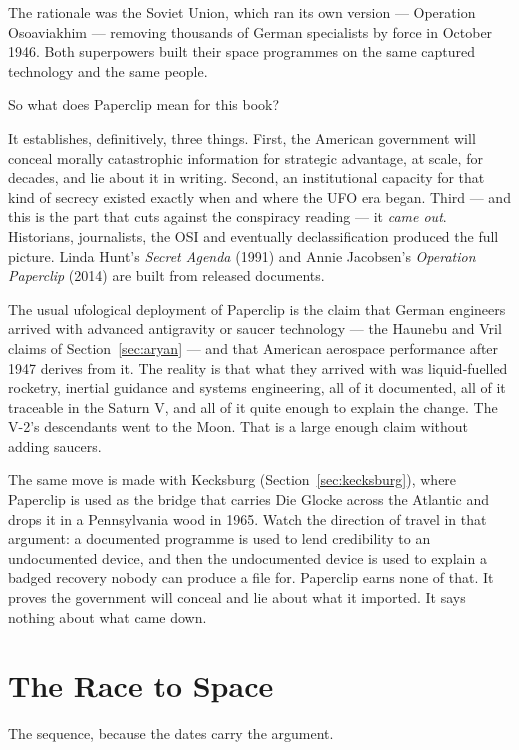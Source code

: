The rationale was the Soviet Union, which ran its own version --- Operation Osoaviakhim ---
removing thousands of German specialists by force in October 1946. Both superpowers built their
space programmes on the same captured technology and the same people.

So what does Paperclip mean for this book?

It establishes, definitively, three things. First, the American government will conceal morally
catastrophic information for strategic advantage, at scale, for decades, and lie about it in
writing. Second, an institutional capacity for that kind of secrecy existed exactly when and where
the UFO era began. Third --- and this is the part that cuts against the conspiracy reading --- it
\emph{came out}. Historians, journalists, the OSI and eventually declassification produced the full
picture. Linda Hunt's \emph{Secret Agenda} (1991) and Annie Jacobsen's \emph{Operation Paperclip}
(2014) are built from released documents.

The usual ufological deployment of Paperclip is the claim that German engineers arrived with
advanced antigravity or saucer technology --- the Haunebu and Vril claims of Section~\ref{sec:aryan} --- and
that American aerospace performance after 1947 derives from it. The reality is that what they
arrived with was liquid-fuelled rocketry, inertial guidance and systems engineering, all of it
documented, all of it traceable in the Saturn V, and all of it quite enough to explain the change.
The V-2's descendants went to the Moon. That is a large enough claim without adding saucers.

The same move is made with Kecksburg (Section~\ref{sec:kecksburg}), where Paperclip is used as the
bridge that carries Die Glocke across the Atlantic and drops it in a Pennsylvania wood in 1965.
Watch the direction of travel in that argument: a documented programme is used to lend credibility
to an undocumented device, and then the undocumented device is used to explain a badged recovery
nobody can produce a file for. Paperclip earns none of that. It proves the government will conceal
and lie about what it imported. It says nothing about what came down.

\section{The Race to Space}\label{sec:racespace}

The sequence, because the dates carry the argument.

